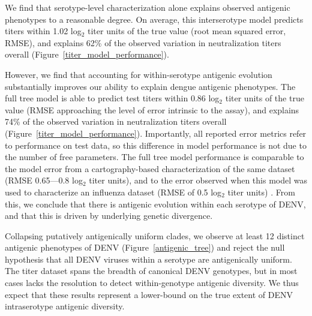 \documentclass[11pt,oneside,letterpaper]{article}
\begin{document}
We find that serotype-level characterization alone explains observed antigenic phenotypes to a reasonable degree.
On average, this interserotype model predicts titers within 1.02 log$_2$ titer units of the true value (root mean squared error, RMSE), and explains 62\% of the observed variation in neutralization titers overall (Figure~\ref{titer_model_performance}).

However, we find that accounting for within-serotype antigenic evolution substantially improves our ability to explain dengue antigenic phenotypes.
The full tree model is able to predict test titers within 0.86 log$_2$ titer units of the true value (RMSE approaching the level of error intrinsic to the assay), and explains 74\% of the observed variation in neutralization titers overall (Figure~\ref{titer_model_performance}).
Importantly, all reported error metrics refer to performance on test data, so this difference in model performance is not due to the number of free parameters.
The full tree model performance is comparable to the model error from a cartography-based characterization of the same dataset (RMSE 0.65---0.8 log$_2$ titer units), and to the error observed when this model was used to characterize an influenza dataset (RMSE of 0.5 log$_2$ titer units) \citep{katzelnick2015dengue,neher2016prediction}.
From this, we conclude that there is antigenic evolution within each serotype of DENV, and that this is driven by underlying genetic divergence.

Collapsing putatively antigenically uniform clades, we observe at least 12 distinct antigenic phenotypes of DENV (Figure~\ref{antigenic_tree}) and reject the null hypothesis that all DENV viruses within a serotype are antigenically uniform.
The titer dataset spans the breadth of canonical DENV genotypes, but in most cases lacks the resolution to detect within-genotype antigenic diversity.
We thus expect that these results represent a lower-bound on the true extent of DENV intraserotype antigenic diversity.
\end{document}

